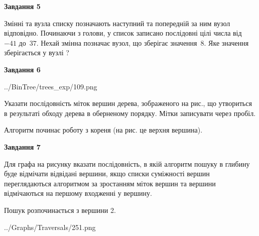 \documentclass[12pt, ukrainian]{article}
\begin{document}
{\begin {large}
{\begin {center}\textbf{Завдання 5}\end {center}}\par
Змінні  та  вузла списку позначають наступний та попередній за ним вузол відповідно. Починаючи з голови, у список записано послідовні цілі числа від~$-41$ до~$37$. Нехай змінна  позначає вузол, що зберігає значення~$8$.
Яке значення зберігається у вузлі  ?\par
\newpage

{\begin {center}\textbf{Завдання 6}\end {center}}\par

\begin{center}
	{../BinTree/trees_exp/109.png}
\end{center}
Указати послідовність міток вершин дерева, зображеного на рис., що утвориться в результаті обходу дерева в оберненому порядку. Мітки записувати через пробіл.\par Алгоритм починає роботу з кореня (на рис. це верхня вершина).\par
\newpage

{\begin {center}\textbf{Завдання 7}\end {center}}\par
Для графа на рисунку вказати послідовність, в якій алгоритм пошуку в глибину буде відмічати відвідані вершини, якщо списки суміжності вершин переглядаються алгоритмом за зростанням міток вершин та вершини відмічаються на першому вход\-женні у вершину.\par
Пошук розпочинається з вершини 2.\par

\begin{center}
	{../Graphs/Traversals/251.png}
\end{center}\par
\newpage


\end{large}}
\end{document}
